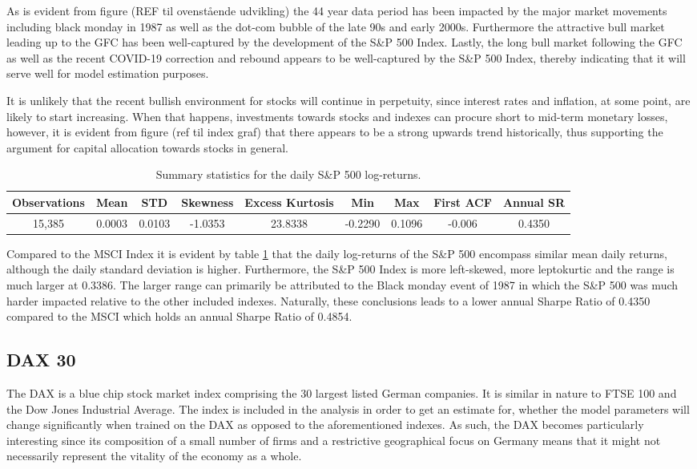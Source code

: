 As is evident from figure (REF til ovenstående udvikling) the 44 year data period has been impacted by the major market movements including black monday in 1987 as well as the dot-com bubble of the late 90s and early 2000s. Furthermore the attractive bull market leading up to the GFC has been well-captured by the development of the S\&P 500 Index. Lastly, the long bull market following the GFC as well as the recent COVID-19 correction and rebound appears to be well-captured by the S\&P 500 Index, thereby indicating that it will serve well for model estimation purposes.  

It is unlikely that the recent bullish environment for stocks will continue in perpetuity, since interest rates and inflation, at some point, are likely to start increasing. When that happens, investments towards stocks and indexes can procure short to mid-term monetary losses, however, it is evident from figure (ref til index graf) that there appears to be a strong upwards trend historically, thus supporting the argument for capital allocation towards stocks in general.


\begin{table}[H]
\caption{Summary statistics for the daily S\&P 500 log-returns.}
\centering
\begin{tabular}{c c c c c c c c c} 
\hline\hline
Observations & Mean & STD & Skewness & Excess Kurtosis & Min & Max & First ACF & Annual SR \\
\hline
15,385 & 0.0003 & 0.0103 & -1.0353 & 23.8338 & -0.2290 & 0.1096 & -0.006 & 0.4350 \\
\hline
\end{tabular}
\label{tab:summary_stats_S&P500}
\end{table}
 
Compared to the MSCI Index it is evident by table \ref{tab:summary_stats_S&P500} that the daily log-returns of the S\&P 500 encompass similar mean daily returns, although the daily standard deviation is higher. Furthermore, the S\&P 500 Index is more left-skewed, more leptokurtic and the range is much larger at 0.3386. The larger range can primarily be attributed to the Black monday event of 1987 in which the S\&P 500 was much harder impacted relative to the other included indexes. Naturally, these conclusions leads to a lower annual Sharpe Ratio of 0.4350 compared to the MSCI which holds an annual Sharpe Ratio of 0.4854.
 
\subsection{DAX 30}
\label{subsection: DAX 30}
The DAX is a blue chip stock market index comprising the 30 largest listed German companies. It is similar in nature to FTSE 100 and the Dow Jones Industrial Average. The index is included in the analysis in order to get an estimate for, whether the model parameters will change significantly when trained on the DAX as opposed to the aforementioned indexes. As such, the DAX becomes particularly interesting since its composition of a small number of firms and a restrictive geographical focus on Germany means that it might not necessarily represent the vitality of the economy as a whole. 

